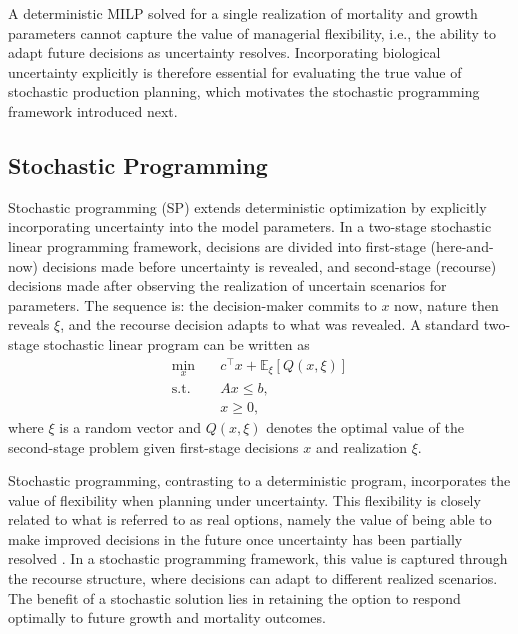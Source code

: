 \documentclass[12pt,a4paper]{article}
\begin{document}
A deterministic MILP solved for a single realization of mortality and growth parameters cannot capture the value of managerial flexibility, i.e., the ability to adapt future decisions as uncertainty resolves. Incorporating biological uncertainty explicitly is therefore essential for evaluating the true value of stochastic production planning, which motivates the stochastic programming framework introduced next.
 
 
\subsection{Stochastic Programming}
\label{sec:stochastic_programming}
 
Stochastic programming (SP) extends deterministic optimization by explicitly incorporating uncertainty into the model parameters. In a two-stage stochastic linear programming framework, decisions are divided into first-stage (here-and-now) decisions made before uncertainty is revealed, and second-stage (recourse) decisions made after observing the realization of uncertain scenarios for parameters. The sequence is: the decision-maker commits to $x$ now, nature then reveals $\xi$, and the recourse decision adapts to what was revealed. A standard two-stage stochastic linear program can be written as
\begin{align}
\min_{x} \quad & c^\top x + \mathbb{E}_\xi \left[ Q(x,\xi) \right] \\
\text{s.t.} \quad & Ax \le b, \\
& x \ge 0,
\end{align}
where $\xi$ is a random vector and $Q(x,\xi)$ denotes the optimal value of the second-stage problem given first-stage decisions $x$ and realization $\xi$.
 
Stochastic programming, contrasting to a deterministic program, incorporates the value of flexibility when planning under uncertainty. This flexibility is closely related to what is referred to as real options, namely the value of being able to make improved decisions in the future once uncertainty has been partially resolved \citep{king2012modeling}. In a stochastic programming framework, this value is captured through the recourse structure, where decisions can adapt to different realized scenarios. The benefit of a stochastic solution lies in retaining the option to respond optimally to future growth and mortality outcomes.
 
\end{document}
